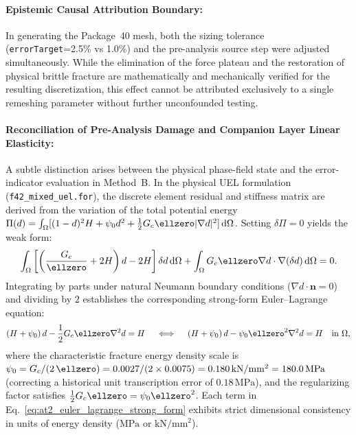 \begin{enumerate}
\paragraph{Epistemic Causal Attribution Boundary:}
In generating the Package~40 mesh, both the sizing tolerance (\texttt{errorTarget}=2.5\% vs 1.0\%) and the pre-analysis source step were adjusted simultaneously. While the elimination of the force plateau and the restoration of physical brittle fracture are mathematically and mechanically verified for the resulting discretization, this effect cannot be attributed exclusively to a single remeshing parameter without further unconfounded testing.

\paragraph{Reconciliation of Pre-Analysis Damage and Companion Layer Linear Elasticity:}
A subtle distinction arises between the physical phase-field state and the error-indicator evaluation in Method~B. In the physical UEL formulation (\texttt{f42\_mixed\_uel.for}), the discrete element residual and stiffness matrix are derived from the variation of the total potential energy $\Pi(d) = \int_\Omega [ (1-d)^2 H + \psi_0 d^2 + \frac{1}{2} G_c \ellzero |\nabla d|^2 ]\,\mathrm{d}\Omega$. Setting $\delta\Pi = 0$ yields the weak form:
\begin{equation}
\int_\Omega \left[ \left(\frac{G_c}{\ellzero} + 2H\right) d - 2H \right] \delta d\,\mathrm{d}\Omega + \int_\Omega G_c \ellzero \nabla d \cdot \nabla(\delta d)\,\mathrm{d}\Omega = 0.
\label{eq:at2_weak_form_uel}
\end{equation}
Integrating by parts under natural Neumann boundary conditions ($\nabla d \cdot \mathbf{n} = 0$) and dividing by $2$ establishes the corresponding strong-form Euler--Lagrange equation:
\begin{equation}
(H + \psi_0)\,d - \frac{1}{2} G_c \ellzero \nabla^2 d = H \quad \iff \quad (H + \psi_0)\,d - \psi_0 \ellzero^2 \nabla^2 d = H \quad \text{in } \Omega,
\label{eq:at2_euler_lagrange_strong_form}
\end{equation}
where the characteristic fracture energy density scale is $\psi_0 = G_c / (2\,\ellzero) = 0.0027 / (2 \times 0.0075) = 0.180\,\mathrm{kN/mm^2} = 180.0\,\mathrm{MPa}$ (correcting a historical unit transcription error of $0.18\,\mathrm{MPa}$), and the regularizing factor satisfies $\frac{1}{2} G_c \ellzero = \psi_0 \ellzero^2$. Each term in Eq.~\eqref{eq:at2_euler_lagrange_strong_form} exhibits strict dimensional consistency in units of energy density ($\mathrm{MPa}$ or $\mathrm{kN/mm^2}$).


\end{enumerate}
